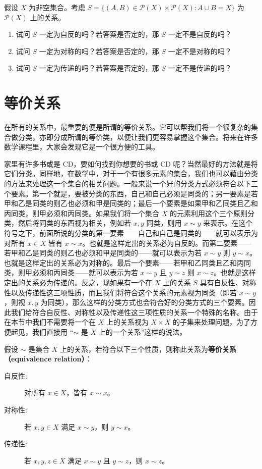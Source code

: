 \begin{question}
假设 $X$ 为非空集合。考虑 $S = \{(A, B) \in \mathcal{P}(X) \times \mathcal{P}(X) : A \cup B = X\}$ 为 $\mathcal{P}(X)$ 上的关系。
\begin{enumerate}
    \item 试问 $S$ 一定为自反的吗？若答案是否定的，那 $S$ 一定不是自反的吗？
    \item 试问 $S$ 一定为对称的吗？若答案是否定的，那 $S$ 一定不是对称的吗？
    \item 试问 $S$ 一定为传递的吗？若答案是否定的，那 $S$ 一定不是传递的吗？
\end{enumerate}
\end{question}

\section{等价关系}

在所有的关系中，最重要的便是所谓的等价关系。它可以帮我们将一个很复杂的集合做分类，亦即分成所谓的等价类，以便让我们更容易掌握这个集合。将来在许多数学课程里，大家会发现它是一个很方便的工具。

家里有许多书或是 CD，要如何找到你想要的书或 CD 呢？当然最好的方法就是将它们分类。同样地，在数学中，对于一个有很多元素的集合，我们也可以藉由分类的方法来处理这一个集合的相关问题。一般来说一个好的分类方式必须符合以下三个要素。第一个就是，要被分类的东西，自己和自己必须是同类的；另一要素是若甲和乙是同类的则乙也必须和甲是同类的；最后一个要素是如果甲和乙同类且乙和丙同类，则甲必须和丙同类。如果我们将一个集合 $X$ 的元素利用这个三个原则分类，然后将同类的东西视为相关，例如若 $x, y$ 同类，则用 $x \sim y$ 来表示。在这个符号之下，前面所说的分类的第一要素——自己和自己是同类的——就可以表示为对所有 $x \in X$ 皆有 $x \sim x$。也就是这样定出的关系必为自反的。而第二要素——若甲和乙是同类的则乙也必须和甲是同类的——就可以表示为若 $x \sim y$ 则 $y \sim x$。也就是这样定出的关系必为对称的。最后一个要素——若甲和乙同类且乙和丙同类，则甲必须和丙同类——就可以表示为若 $x \sim y$ 且 $y \sim z$ 则 $x \sim z$。也就是这样定出的关系必为传递的。反之，现如果有一个在 $X$ 上的关系 $S$ 具有自反性、对称性以及传递性这三项性质，而且我们将符合这个关系的元素视为同类（即若 $x \sim y$，则视 $x, y$ 为同类），那么这样的分类方式也会符合好的分类方式的三个要素。因此我们给符合自反性、对称性以及传递性这三项性质的关系一个特殊的名称。由于在本节中我们不需要将一个在 $X$ 上的关系视为 $X \times X$ 的子集来处理问题，为了方便起见，我们直接用 “$\sim$ 是 $X$ 上的一个关系”这样的说法。

\begin{definition}
假设 $\sim$ 是集合 $X$ 上的关系，若符合以下三个性质，则称此关系为{\bf 等价关系（equivalence relation）}：
\begin{description}
    \item[自反性:] 对所有 $x \in X$，皆有 $x \sim x$。
    \item[对称性:] 若 $x, y \in X$ 满足 $x \sim y$，则 $y \sim x$。
    \item[传递性:] 若 $x, y, z \in X$ 满足 $x \sim y$ 且 $y \sim z$，则 $x \sim z$。
\end{description}
\end{definition}

